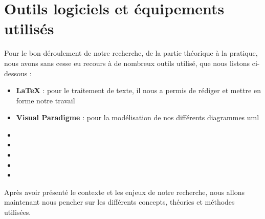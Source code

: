     \section[Outils logiciels et équipements utilisés]{Outils logiciels et équipements utilisés}
    Pour le bon déroulement de notre recherche, de la partie
    théorique à la pratique, nous avons sans cesse eu recours
    à de nombreux outils utilisé, que nous listons ci-dessous :
    \par
        \begin{itemize}
            \setlength{\itemsep}{0pt}
            \item [\ding{226}] \textbf{\LaTeX} : pour le traitement de texte, il nous a permis de
            rédiger et mettre en forme notre travail
            \item [\ding{226}] \textbf{Visual Paradigme} : pour la modélisation de nos
            différents diagrammes \acrshort*{uml}
            \item [\ding{226}]
            \item [\ding{226}]
            \item [\ding{226}]
            \item [\ding{226}]
            \item [\ding{226}]
        \end{itemize}
    Après avoir présenté le contexte et les enjeux de notre recherche, nous allons maintenant nous pencher sur
    les différents concepts, théories et méthodes utilisées.